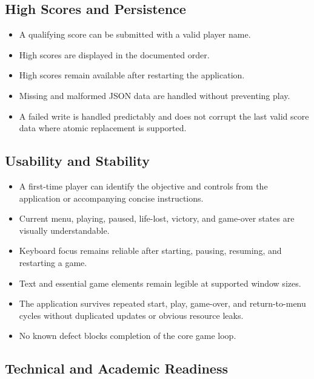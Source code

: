 \subsection{High Scores and Persistence}

\begin{itemize}
	\item[$\square$] A qualifying score can be submitted with a valid player name.
	\item[$\square$] High scores are displayed in the documented order.
	\item[$\square$] High scores remain available after restarting the application.
	\item[$\square$] Missing and malformed JSON data are handled without preventing play.
	\item[$\square$] A failed write is handled predictably and does not corrupt the last valid score data where atomic replacement is supported.
\end{itemize}

\subsection{Usability and Stability}

\begin{itemize}
	\item[$\square$] A first-time player can identify the objective and controls from the application or accompanying concise instructions.
	\item[$\square$] Current menu, playing, paused, life-lost, victory, and game-over states are visually understandable.
	\item[$\square$] Keyboard focus remains reliable after starting, pausing, resuming, and restarting a game.
	\item[$\square$] Text and essential game elements remain legible at supported window sizes.
	\item[$\square$] The application survives repeated start, play, game-over, and return-to-menu cycles without duplicated updates or obvious resource leaks.
	\item[$\square$] No known defect blocks completion of the core game loop.
\end{itemize}

\subsection{Technical and Academic Readiness}

